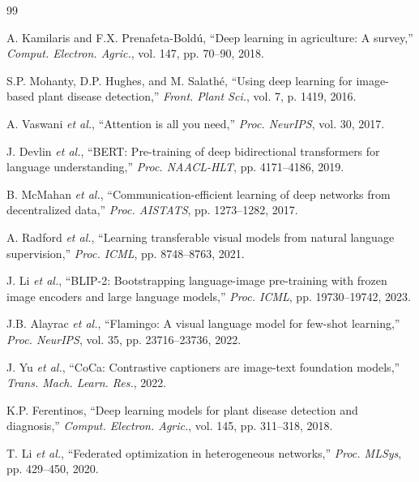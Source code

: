 \documentclass[10pt,journal,compsoc]{IEEEtran}
\begin{document}
\begin{thebibliography}{99}

A. Kamilaris and F.X. Prenafeta-Bold{\'u}, ``Deep learning in agriculture: A survey,'' \textit{Comput. Electron. Agric.}, vol. 147, pp. 70--90, 2018.

S.P. Mohanty, D.P. Hughes, and M. Salath{\'e}, ``Using deep learning for image-based plant disease detection,'' \textit{Front. Plant Sci.}, vol. 7, p. 1419, 2016.

A. Vaswani \textit{et al.}, ``Attention is all you need,'' \textit{Proc. NeurIPS}, vol. 30, 2017.

J. Devlin \textit{et al.}, ``BERT: Pre-training of deep bidirectional transformers for language understanding,'' \textit{Proc. NAACL-HLT}, pp. 4171--4186, 2019.

B. McMahan \textit{et al.}, ``Communication-efficient learning of deep networks from decentralized data,'' \textit{Proc. AISTATS}, pp. 1273--1282, 2017.

A. Radford \textit{et al.}, ``Learning transferable visual models from natural language supervision,'' \textit{Proc. ICML}, pp. 8748--8763, 2021.

J. Li \textit{et al.}, ``BLIP-2: Bootstrapping language-image pre-training with frozen image encoders and large language models,'' \textit{Proc. ICML}, pp. 19730--19742, 2023.

J.B. Alayrac \textit{et al.}, ``Flamingo: A visual language model for few-shot learning,'' \textit{Proc. NeurIPS}, vol. 35, pp. 23716--23736, 2022.

J. Yu \textit{et al.}, ``CoCa: Contrastive captioners are image-text foundation models,'' \textit{Trans. Mach. Learn. Res.}, 2022.

K.P. Ferentinos, ``Deep learning models for plant disease detection and diagnosis,'' \textit{Comput. Electron. Agric.}, vol. 145, pp. 311--318, 2018.

T. Li \textit{et al.}, ``Federated optimization in heterogeneous networks,'' \textit{Proc. MLSys}, pp. 429--450, 2020.


\end{thebibliography}
\end{document}
